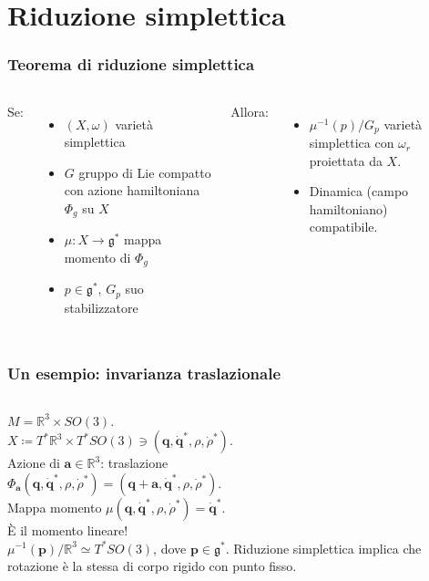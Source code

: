 \documentclass[]{beamer}
\newcommand{\R}{\mathbb{R}}
\renewcommand{\vec}[1]{\boldsymbol{#1}}
\newcommand{\defeq}{\coloneq}
\begin{document}
\section{Riduzione simplettica}

\begin{frame}
  \frametitle{Teorema di riduzione simplettica}
  \begin{columns}
    Se:
    \begin{itemize}
      \item $(X, \omega)$ varietà simplettica
      \item $G$ gruppo di Lie compatto con azione hamiltoniana $\Phi_g$ su $X$
      \item $\mu: X \to \mathfrak{g}^*$ mappa momento di $\Phi_g$
      \item $p \in \mathfrak{g^*}$, $G_p$ suo stabilizzatore
    \end{itemize}
    Allora:
    \begin{itemize}
      \item $\mu^{-1}(p)/G_p$ \alert{varietà simplettica} con $\omega_r$ proiettata da $X$.
      \item Dinamica (campo hamiltoniano) compatibile.
    \end{itemize}
      \begin{center}
            
      \end{center}
  \end{columns}
\end{frame}

\begin{frame}
\frametitle{Un esempio: invarianza traslazionale}
\begin{columns}
  $M = \R^3 \times SO(3)$.\\ $X \defeq T^* \R^3 \times T^*SO(3) \ni (\vec{q}, \vec{\dot{q}}^*, \rho, \dot{\rho}^*)$.\\[5pt]
  Azione di $\vec{a} \in \R^3$: traslazione\\ $\Phi_{\vec{a}}(\vec{q}, \vec{\dot{q}}^*, \rho, \dot{\rho}^*) = (\vec{q}+\vec{a}, \vec{\dot{q}}^*, \rho, \dot{\rho}^*)$.\\[5pt]
  Mappa momento $\mu(\vec{q}, \vec{\dot{q}}^*, \rho, \dot{\rho}^*) = \vec{\dot{q}}^*$.\\ È il \alert{momento lineare}!\\[11pt]
  $\mu^{-1}(\vec{p})/\R^3 \simeq T^* SO(3)$, dove $\vec{p} \in \mathfrak{g}^*$. Riduzione simplettica implica che rotazione è la stessa di corpo rigido con punto fisso.
    \begin{center}
          
    \end{center}
\end{columns}
\end{frame}
\end{document}
